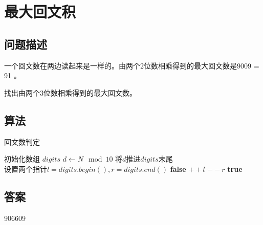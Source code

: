 \section{最大回文积}
\subsection{问题描述}
\begin{tcolorbox}
	一个回文数在两边读起来是一样的。由两个2位数相乘得到的最大回文数是9009 = 91 。

	找出由两个3位数相乘得到的最大回文数。
\end{tcolorbox}

\subsection{算法}
\begin{algorithm}
	\caption{回文数判定}
	\begin{algorithmic}[1]
		\State 初始化数组 $digits$
		\State $d \gets N \mod 10$
		\State $将d推进digits末尾$
		\EndWhile
		\State $设置两个指针 l=digits.begin(), r = digits.end()$
		\Return \textbf{false}
		\EndIf
		\State $++l$
		\State $--r$
		\EndWhile
		\Return \textbf{true}
		\EndFunction
	\end{algorithmic}
\end{algorithm}

\subsection{答案}
906609
